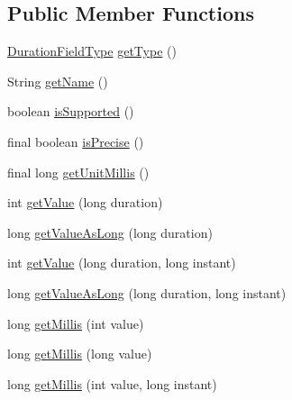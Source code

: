 \subsection*{Public Member Functions}
\begin{DoxyCompactItemize}
\item 
\hyperlink{classorg_1_1joda_1_1time_1_1_duration_field_type}{Duration\-Field\-Type} \hyperlink{classorg_1_1joda_1_1time_1_1field_1_1_millis_duration_field_aadbafd301789f7058717cf7ba9c2041a}{get\-Type} ()
\item 
String \hyperlink{classorg_1_1joda_1_1time_1_1field_1_1_millis_duration_field_a9de123f2b906d00c8a6256671383dd5a}{get\-Name} ()
\item 
boolean \hyperlink{classorg_1_1joda_1_1time_1_1field_1_1_millis_duration_field_adde0a72d4f750ae070c1c2ee4231d540}{is\-Supported} ()
\item 
final boolean \hyperlink{classorg_1_1joda_1_1time_1_1field_1_1_millis_duration_field_aa832b22e1a6dd45f8e9a50e7dea72dc7}{is\-Precise} ()
\item 
final long \hyperlink{classorg_1_1joda_1_1time_1_1field_1_1_millis_duration_field_aa8cc1771750c4b8782d1b034df956f55}{get\-Unit\-Millis} ()
\item 
int \hyperlink{classorg_1_1joda_1_1time_1_1field_1_1_millis_duration_field_af16b4c0be8ea855670374a5c3a49e925}{get\-Value} (long duration)
\item 
long \hyperlink{classorg_1_1joda_1_1time_1_1field_1_1_millis_duration_field_a3c8f6c24b71c630ea0681532dce705e2}{get\-Value\-As\-Long} (long duration)
\item 
int \hyperlink{classorg_1_1joda_1_1time_1_1field_1_1_millis_duration_field_accf89bc5ba0bee630d80d095bea8eafc}{get\-Value} (long duration, long instant)
\item 
long \hyperlink{classorg_1_1joda_1_1time_1_1field_1_1_millis_duration_field_aa291f431038a3a8a02c9931c626d8c5f}{get\-Value\-As\-Long} (long duration, long instant)
\item 
long \hyperlink{classorg_1_1joda_1_1time_1_1field_1_1_millis_duration_field_a9b9a32037fe7e0c9a980fd6eaf21fdb7}{get\-Millis} (int value)
\item 
long \hyperlink{classorg_1_1joda_1_1time_1_1field_1_1_millis_duration_field_a4ece41997ee0aba7760a36b1d3b34eba}{get\-Millis} (long value)
\item 
long \hyperlink{classorg_1_1joda_1_1time_1_1field_1_1_millis_duration_field_a5530dc602a27d63bce576ddb41a62454}{get\-Millis} (int value, long instant)
\item 

\end{DoxyCompactItemize}
